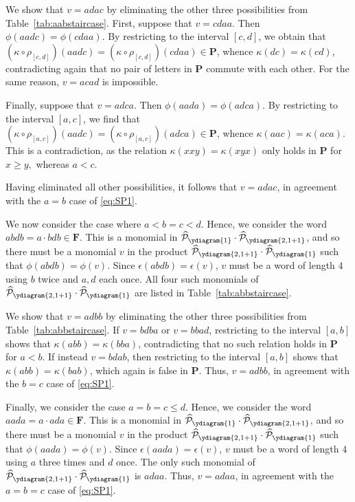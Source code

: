 \documentclass[12 pt]{amsart}
\newcommand{\Plactic}{{\mathbf{P}}}
\newcommand{\Free}{\mathbf{F}}
\newcommand{\sFreeSchur}{\widehat{\mathcal{P}}}
\theoremstyle{remark}
\numberwithin{equation}{section}
\begin{document}
    We show that $v = adac$ by eliminating the other three possibilities from Table~\ref{tab:aabstaircase}. First, suppose that $v = cdaa$. Then $\phi(aadc) = \phi(cdaa)$. By restricting to the interval $[c,d]$, we obtain that 
    $(\kappa \circ \rho_{[c,d]})(aadc) = (\kappa \circ \rho_{[c,d]})(cdaa) \in \Plactic$, whence $\kappa(dc) = \kappa(cd)$, contradicting again that no pair of letters in $\Plactic$ commute with each other. For the same reason, $v = acad$ is impossible.
    
   Finally, suppose that $v = adca$. Then $\phi(aada) = \phi(adca)$. By restricting to the interval $[a,c]$, we find that
   $(\kappa \circ \rho_{[a,c]})(aadc) = (\kappa \circ \rho_{[a,c]})(adca) \in \Plactic$, whence 
 $\kappa(aac) = \kappa(aca)$. This is a contradiction, as the relation $\kappa(xxy) = \kappa(xyx)$ only holds in $\Plactic$ for $x \geq y,$ whereas $a < c$.

    Having eliminated all other possibilities, it follows that $v = adac$, in agreement with the $a=b$ case of \eqref{eq:SP1}.
    
    We now consider the case where $a<b=c<d$. Hence, we consider the word $abdb = a \cdot bdb \in \Free$. This is a monomial in $\sFreeSchur_{\ydiagram{1}}\cdot \sFreeSchur_{\ydiagram{2,1+1}}$, and so there must be a monomial $v$ in the product 
    $\sFreeSchur_{\ydiagram{2,1+1}} \cdot \sFreeSchur_{\ydiagram{1}}$ such that
   $\phi(abdb) = \phi(v)$. Since $\epsilon(abdb) = \epsilon(v)$,
   $v$ must be a word of length $4$ using $b$ twice and $a,d$ each once. All four such monomials of $\sFreeSchur_{\ydiagram{2,1+1}} \cdot \sFreeSchur_{\ydiagram{1}}$ are listed in 
   Table~\ref{tab:abbstaircase}. 

   We show that $v = adbb$ by eliminating the other three possibilities from Table~\ref{tab:abbstaircase}. If $v = bdba$ or $v = bbad$, restricting to the interval $[a,b]$ shows that $\kappa(abb) = \kappa(bba)$, contradicting that no such relation holds in $\Plactic$ for $a < b$.
   If instead $v = bdab$, then restricting to the interval $[a,b]$ shows that $\kappa(abb) = \kappa(bab)$, which again is false in $\Plactic$. Thus, $v = adbb$, in agreement with the $b=c$ case of \eqref{eq:SP1}.
    
    Finally, we consider the case $a =b=c\leq d$. Hence, we consider the word $aada = a \cdot ada \in \Free$. This is a monomial in
    $\sFreeSchur_{\ydiagram{1}}\cdot \sFreeSchur_{\ydiagram{2,1+1}}$, and so there must be a monomial $v$ in the product 
    $\sFreeSchur_{\ydiagram{2,1+1}} \cdot \sFreeSchur_{\ydiagram{1}}$ such that
   $\phi(aada) = \phi(v)$. Since $\epsilon(aada) = \epsilon(v)$,
   $v$ must be a word of length $4$ using $a$ three times and $d$ once. The only such monomial of $\sFreeSchur_{\ydiagram{2,1+1}} \cdot \sFreeSchur_{\ydiagram{1}}$ is $adaa$. Thus, $v = adaa$, in agreement with the $a=b=c$ case of \eqref{eq:SP1}.
    
\end{document}
